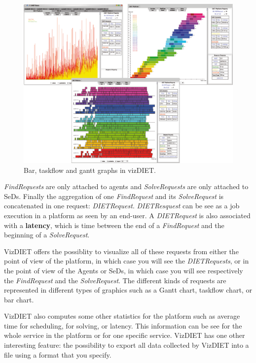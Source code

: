 \begin{figure}[htb]
  \begin{center}
    \includegraphics[scale=0.4]{fig/VizDIET_screenshot_2}
    \caption{Bar, taskflow and gantt graphs in vizDIET.}
    \label{fig:vizStats}
  \end{center}
\end{figure}

  \textit{FindRequests} are only attached to agents and \textit{SolveRequests}
  are only attached to SeDs. Finally the aggregation of one
  \textit{FindRequest} and its \textit{SolveRequest} is concatenated in one
  request: \textit{DIETRequest}. \textit{DIETResquest} can be see as a job
  execution in a \diet platform as seen by an end-user. A \textit{DIETRequest}
  is also associated with a  \textbf{latency}, which is time between the end of
  a \textit{FindRequest} and the beginning of a \textit{SolveRequest}.

VizDIET offers the possiblity to visualize all of these requests from  either
the point of view of the \diet platform, in which case you will see the
\textit{DIETRequests}, or in the point of view of the Agents or SeDs, in which
case you will see respectively the \textit{FindRequest} and the
\textit{SolveRequest}. The different kinds of requests are represented in
different types of graphics such as a Gantt chart, taskflow chart, or bar
chart.

VizDIET also computes some other statistics for the platform such as average
time for scheduling, for solving, or latency. This information can be see for
the whole service in the platform or for one specific service. VizDIET has one
other interesting feature: the possibility to export all data collected by
VizDIET into a file using a format that you specify.


